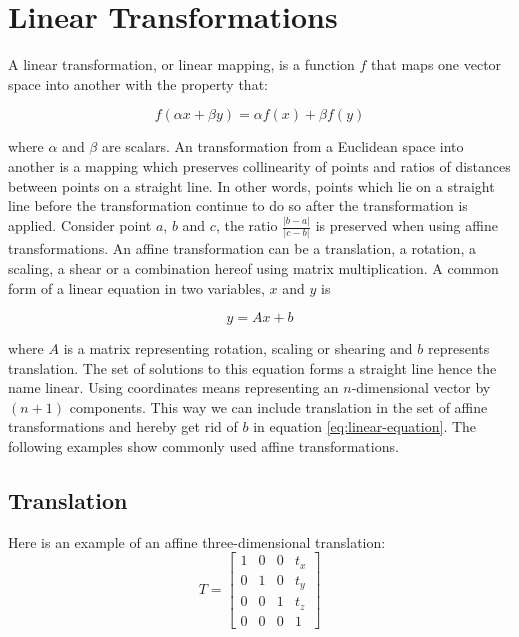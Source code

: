
\section{Linear Transformations}
\label{sec:linear_transformation}
A linear transformation, or linear mapping, is a function $f$ that maps
one vector space into another with the property that:

\begin{equation}
f(\alpha x + \beta y) = \alpha f(x) + \beta f(y)
\end{equation}

where $\alpha$ and $\beta$ are scalars.
An  transformation from a Euclidean space into another is
a mapping which preserves collinearity of points and ratios of
distances between points on a straight line. In other words, points which lie
on a straight line before the transformation continue to do so after the transformation is
applied. Consider point $a$, $b$ and $c$, the ratio $\frac{ \vert
  b-a\vert}{\vert c-b \vert}$ is preserved when using affine transformations.
An affine transformation can be a translation, a rotation, a scaling,
a shear or a combination hereof using matrix
multiplication.
%
A common form of a linear equation in two variables, $x$ and $y$ is 

\begin{equation}
\label{eq:linear-equation}
y = A x + b
\end{equation}

where $A$ is a matrix representing rotation, scaling or shearing and
$b$ represents translation. 
The set of solutions to this equation forms a straight line hence the
name linear. Using  coordinates means representing an
$n$-dimensional vector by $(n+1)$ components. This way we can
include translation in the set of affine transformations and hereby get rid of
$b$ in equation \eqref{eq:linear-equation}. 
The following examples show commonly used affine transformations. \\

\subsection*{Translation}
\label{sec:basic_math_translation}
Here is an example of an affine three-dimensional translation:
\begin{equation}
\label{eq:translation_matrix}
T = 
\begin{bmatrix} 
1 & 0 & 0 & t_x \\ 
0 & 1 & 0 & t_y \\ 
0 & 0 & 1 & t_z \\
0 & 0 & 0 & 1 
\end{bmatrix} 
\end{equation} 

